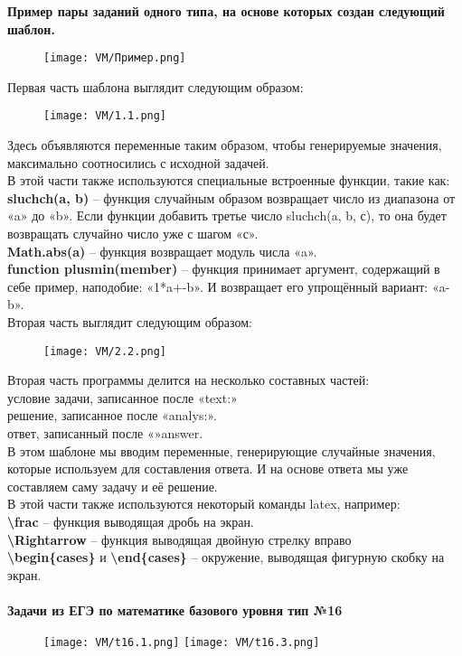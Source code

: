 \quad \textbf{Пример пары заданий одного типа, на основе которых создан следующий шаблон. } 

\begin{figure}[h]
		\centering
		\texttt{[image: VM/Пример.png]}
\label{ris:image}
\end{figure}

\quad Первая часть шаблона выглядит следующим образом:
	\begin{figure}[h]
		\centering
		\texttt{[image: VM/1.1.png]}
	\end{figure}

\quad Здесь объявляются переменные таким образом, чтобы генерируемые значения,  максимально соотносились с исходной задачей.
\\ В этой части также используются специальные встроенные функции, такие как:
\\ \textbf{sluchch(a, b)} – функция случайным образом возвращает число из диапазона от «a» до «b». Если функции добавить третье число sluchch(a, b, с), то она будет возвращать случайно число уже с шагом «с».
\\ \textbf{Math.abs(a)} – функция возвращает модуль числа «a».
\\ \textbf{function plusmin(member)} – функция принимает аргумент, содержащий в себе пример, наподобие: «1*a+-b». И возвращает его упрощённый вариант: «a-b».
\\
\quad Вторая часть выглядит следующим образом:
	\begin{figure}[h]
		\centering
		\texttt{[image: VM/2.2.png]}
	\end{figure}

\quad Вторая часть программы делится на несколько составных частей:
\\ условие задачи, записанное после «text:»
\\ решение, записанное после «analys:».
\\ ответ, записанный после «»answer.
\\ \quad В этом шаблоне мы вводим переменные, генерирующие случайные значения, которые используем для составления ответа. И на основе ответа мы уже составляем саму задачу и её решение.
\\ \quad  В этой части также используются некоторый команды latex, например:
\\ \textbf{\textbackslash frac} – функция выводящая дробь на экран.
\\ \textbf{\textbackslash Rightarrow} – функция выводящая двойную стрелку вправо
\\ \textbf{\textbackslash begin\{cases\}} и \textbf{\textbackslash end\{cases\}} – окружение, выводящая фигурную скобку на экран. 
\\
\\
\textbf{Задачи из ЕГЭ по математике базового уровня тип №16}
	\begin{figure}[h]
		\centering
		\texttt{[image: VM/t16.1.png]}
		\texttt{[image: VM/t16.3.png]}
	\end{figure}
	
